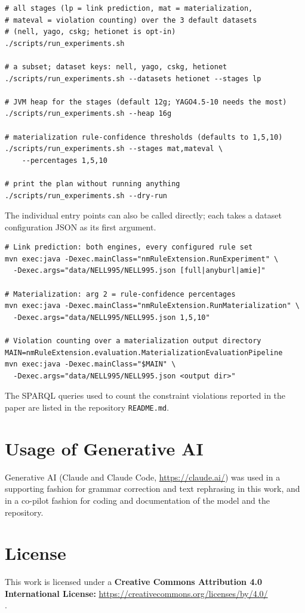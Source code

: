\documentclass[runningheads]{llncs}
\newcommand{\suppurl}[2]{\noindent\textbf{#1:} \url{#2}\\}
\begin{document}
{\small
\begin{verbatim}
# all stages (lp = link prediction, mat = materialization,
# mateval = violation counting) over the 3 default datasets
# (nell, yago, cskg; hetionet is opt-in)
./scripts/run_experiments.sh

# a subset; dataset keys: nell, yago, cskg, hetionet
./scripts/run_experiments.sh --datasets hetionet --stages lp

# JVM heap for the stages (default 12g; YAGO4.5-10 needs the most)
./scripts/run_experiments.sh --heap 16g

# materialization rule-confidence thresholds (defaults to 1,5,10)
./scripts/run_experiments.sh --stages mat,mateval \
    --percentages 1,5,10

# print the plan without running anything
./scripts/run_experiments.sh --dry-run
\end{verbatim}
}

The individual entry points can also be called directly; each takes a dataset configuration JSON as
its first argument.

{\small
\begin{verbatim}
# Link prediction: both engines, every configured rule set
mvn exec:java -Dexec.mainClass="nmRuleExtension.RunExperiment" \
  -Dexec.args="data/NELL995/NELL995.json [full|anyburl|amie]"

# Materialization: arg 2 = rule-confidence percentages
mvn exec:java -Dexec.mainClass="nmRuleExtension.RunMaterialization" \
  -Dexec.args="data/NELL995/NELL995.json 1,5,10"

# Violation counting over a materialization output directory
MAIN=nmRuleExtension.evaluation.MaterializationEvaluationPipeline
mvn exec:java -Dexec.mainClass="$MAIN" \
  -Dexec.args="data/NELL995/NELL995.json <output dir>"
\end{verbatim}
}

The SPARQL queries used to count the constraint violations reported in the paper are listed in the
repository \texttt{README.md}.

\section{Usage of Generative AI}
Generative AI (Claude and Claude Code, \url{https://claude.ai/}) was used in a supporting fashion for grammar correction and text rephrasing in this work, and in a co-pilot fashion for coding and documentation of the model and the repository.

\section{License}
This work is licensed under a \suppurl{Creative Commons Attribution 4.0 International License}{https://creativecommons.org/licenses/by/4.0/}.
\end{document}
